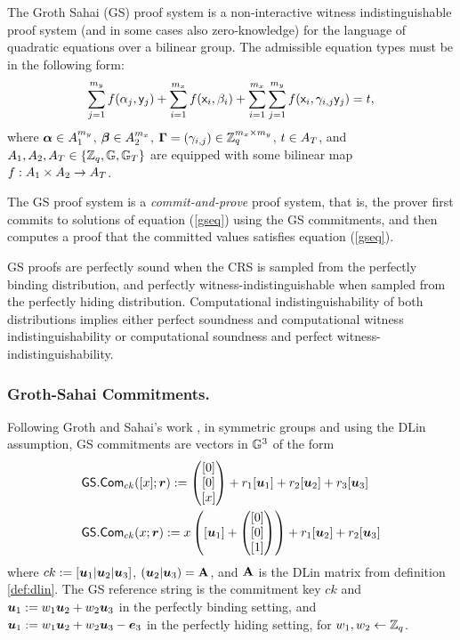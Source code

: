 The Groth Sahai (GS) proof system is a non-interactive witness indistinguishable proof system (and in some cases also zero-knowledge) for the language of quadratic equations over a bilinear group. The admissible equation types must be in the following form:
\begin{equation}\label{gseq}
\sum_{j=1}^{m_y} f(\alpha_j, \mathsf{y}_j)+\sum_{i=1}^{m_x} f(\mathsf{x}_i, \beta_i)+\sum_{i=1}^{m_x} \sum_{j=1}^{m_y}  f(\mathsf{x}_i,\gamma_{i,j} \mathsf{y}_j)=t,
\end{equation}
 where $\boldsymbol \alpha  \in A_1^{m_y}$, $\boldsymbol \beta  \in A_2^{m_x}$, $\mathbf{{\Gamma}}=(\gamma_{i,j}) \in \mathbb{Z}_q^{m_x\times m_y}$, $t \in A_T$, and $A_1,A_2,A_T\in\{\mathbb{Z}_q,\mathbb{G},\mathbb{G}_T\}$ 
are equipped with some bilinear map $f:A_1\times A_2 \rightarrow A_T$.

The GS proof system is a \emph{commit-and-prove} proof system, that is, the prover first commits to solutions
of equation (\ref{gseq}) using the GS commitments, and then computes a proof that the committed values satisfies equation (\ref{gseq}).

GS proofs are perfectly sound when the CRS is sampled from the perfectly binding distribution, and perfectly witness-indistinguishable when sampled from the perfectly hiding distribution. Computational indistinguishability of  both distributions implies either perfect soundness and computational witness indistinguishability or computational soundness and perfect witness-indistinguishability.

\subsubsection{Groth-Sahai Commitments.}
Following Groth and Sahai's work \cite{EC:GroSah08}, in symmetric groups and using the  DLin assumption, GS commitments are vectors in $\mathbb{G}^3$ of the form
\begin{align*}
&{\mathsf{GS}}.\mathsf{Com}_{ck}([x];{\boldsymbol{r}}):=\left(\begin{matrix}{[0]}\\{[0]}\\{[x]}\end{matrix}\right)+r_1[{\boldsymbol{u}}_1]+{r}_2[{\boldsymbol{u}}_2]+r_3[{\boldsymbol{u}}_3]\\
&{\mathsf{GS}}.\mathsf{Com}_{ck}(x;{\boldsymbol{r}}):=x\left([{\boldsymbol{u}}_1]+\left(\begin{matrix}{[0]}\\{[0]}\\{[1]}\end{matrix}\right)\right)+{r}_1[{\boldsymbol{u}}_2]+r_2[{\boldsymbol{u}}_3]
\end{align*}
where $ck:=[{\boldsymbol{u}}_1|{\boldsymbol{u}}_2|{\boldsymbol{u}}_3]$, $({\boldsymbol{u}}_2|{\boldsymbol{u}}_3)=\mathbf{{A}}$, and $\mathbf{{A}}$ is the DLin matrix from definition \ref{def:dlin}. The GS reference string is the commitment key $ck$  and ${\boldsymbol{u}}_1:=w_1{\boldsymbol{u}}_2+w_2{\boldsymbol{u}}_3$ in the perfectly binding setting, and ${\boldsymbol{u}}_1:=w_1{\boldsymbol{u}}_2+w_2{\boldsymbol{u}}_3-{\boldsymbol{e}}_3$ in the perfectly hiding setting, for $w_1,w_2\gets\mathbb{Z}_q$.
